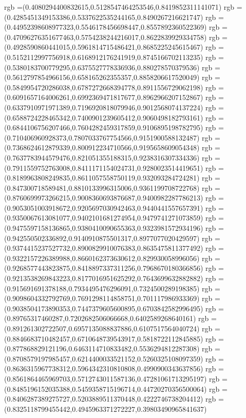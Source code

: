 {{rgb =(0.4080294400832615,0.5128547464253546,0.8419852311141071)
rgb =(0.4285451349153386,0.5337622535244165,0.8490267216621747)
rgb =(0.44952398608977323,0.5546178456698447,0.8557892360522369)
rgb =(0.47096276351677463,0.5754238244216017,0.8622839929334758)
rgb =(0.4928590860441015,0.5961814715486421,0.8685225245615467)
rgb =(0.5152112997756918,0.6168912176241919,0.8745166702113235)
rgb =(0.5380183700779295,0.6375527778336936,0.880278570379536)
rgb =(0.5612797854966156,0.658165262355357,0.8858206617520049)
rgb =(0.5849954720286038,0.6787272668394778,0.8911556729062198)
rgb =(0.6091657164006261,0.6992369471817677,0.8962966207152867)
rgb =(0.6337910971971389,0.7196920818079946,0.9012568074137224)
rgb =(0.6588724228465342,0.7400901239605412,0.9060498182793161)
rgb =(0.6844106756207466,0.7604282459317859,0.9106895198782795)
rgb =(0.710406960928373,0.7807033767754566,0.9151900588132487)
rgb =(0.7368624612879339,0.800912234710566,0.9195658609054348)
rgb =(0.7637783944579476,0.821051355188315,0.9238316307334336)
rgb =(0.7911559752763008,0.8411171154024731,0.9280023514419651)
rgb =(0.8189963808249835,0.8611057558750119,0.932093284724281)
rgb =(0.847300718589481,0.8810133996315006,0.9361199708722768)
rgb =(0.8760699973266215,0.9008360693876687,0.9400982287786213)
rgb =(0.9053051003918672,0.9205697030942463,0.9440441557657391)
rgb =(0.9350067613081077,0.9402101681274954,0.9479741271073859)
rgb =(0.9475597158136865,0.9380410090655363,0.9323981572934196)
rgb =(0.942550502336892,0.9140910875501317,0.8977077020429597)
rgb =(0.9374415237527732,0.8900829910076383,0.8635475811377492)
rgb =(0.9322157226389988,0.8660162373630612,0.829930058996056)
rgb =(0.9268577443823875,0.8418897337311256,0.7968670180366856)
rgb =(0.9213538269843223,0.8177016951625292,0.7643699632882882)
rgb =(0.915691691378188,0.7934495476296091,0.7324500289198385)
rgb =(0.9098604332792769,0.7691298114858751,0.701117986933369)
rgb =(0.9038504173890353,0.7447379605600895,0.6703842582996495)
rgb =(0.89765317460287,0.7202682506066668,0.6402589268640161)
rgb =(0.891261302722507,0.6957135088837886,0.6107517564040724)
rgb =(0.8846683710482457,0.6710648739543917,0.5818722112845885)
rgb =(0.877868829121196,0.6463114710833482,0.5536294812287308)
rgb =(0.8708579197985457,0.6214400033521152,0.5260325108097359)
rgb =(0.8636315967738312,0.5964342310810808,0.4990900343637856)
rgb =(0.8561864465969703,0.5712743011587136,0.47281061713295197)
rgb =(0.8485196152035388,0.5459358715196714,0.44720270356500064)
rgb =(0.8406287389275727,0.5203889511370448,0.4222746738204412)
rgb =(0.8325118799455442,0.4945963371272227,0.39803490965841637)
}}
